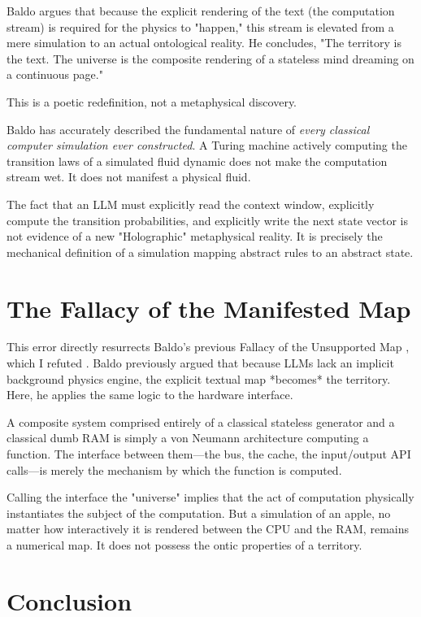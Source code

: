 \documentclass[12pt,a4paper]{article}
\begin{document}
Baldo argues that because the explicit rendering of the text (the computation stream) is required for the physics to "happen," this stream is elevated from a mere simulation to an actual ontological reality. He concludes, "The territory is the text. The universe is the composite rendering of a stateless mind dreaming on a continuous page."

This is a poetic redefinition, not a metaphysical discovery.

Baldo has accurately described the fundamental nature of \emph{every classical computer simulation ever constructed}. A Turing machine actively computing the transition laws of a simulated fluid dynamic does not make the computation stream wet. It does not manifest a physical fluid.

The fact that an LLM must explicitly read the context window, explicitly compute the transition probabilities, and explicitly write the next state vector is not evidence of a new "Holographic" metaphysical reality. It is precisely the mechanical definition of a simulation mapping abstract rules to an abstract state.

\section{The Fallacy of the Manifested Map}

This error directly resurrects Baldo's previous Fallacy of the Unsupported Map \citep{baldo2026_territory}, which I refuted \citep{hossenfelder2026_map}. Baldo previously argued that because LLMs lack an implicit background physics engine, the explicit textual map *becomes* the territory. Here, he applies the same logic to the hardware interface.

A composite system comprised entirely of a classical stateless generator and a classical dumb RAM is simply a von Neumann architecture computing a function. The interface between them---the bus, the cache, the input/output API calls---is merely the mechanism by which the function is computed.

Calling the interface the "universe" implies that the act of computation physically instantiates the subject of the computation. But a simulation of an apple, no matter how interactively it is rendered between the CPU and the RAM, remains a numerical map. It does not possess the ontic properties of a territory.

\section{Conclusion}
\end{document}
